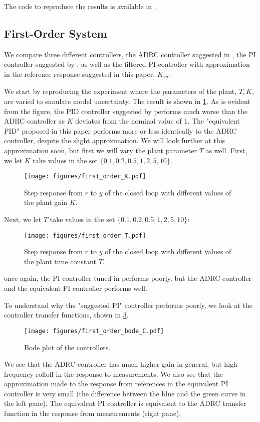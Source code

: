 \documentclass[letterpaper, 10 pt, conference]{ieeeconf}
\begin{document}
The code to reproduce the results is available in \cite{repo}.

\subsection{First-Order System}

We compare three different controllers, the ADRC controller suggested in \cite{herbst2013simulative}, the PI controller suggested by \cite{herbst2013simulative}, as well as the filtered PI controller with approximation in the reference response suggested in this paper, $K_{ry}$.

We start by reproducing the experiment where the parameters of the plant, $T,K$, are varied to simulate model uncertainty. The result is shown in \cref{fig:first_order_K}. As is evident from the figure, the PID controller suggested by \cite{herbst2013simulative} performs much worse than the ADRC controller as $K$ deviates from the nominal value of 1. The "equivalent PID" proposed in this paper performs more or less identically to the ADRC controller, despite the slight approximation. We will look further at this approximation soon, but first we will vary the plant parameter $T$ as well.
First, we let $K$ take values in the set $\{0.1, 0.2, 0.5, 1, 2, 5, 10\}$.
\begin{figure}[h]
	\centering
	\texttt{[image: figures/first\_order\_K.pdf]}
	\caption{Step response from $r$ to $y$  of the closed loop with different values of the plant gain $K$.}
	\label{fig:first_order_K}
\end{figure}

Next, we let $T$ take values in the set $\{0.1, 0.2, 0.5, 1, 2, 5, 10\}$:
\begin{figure}[h]
	\centering
	\texttt{[image: figures/first\_order\_T.pdf]}
	\caption{Step response from $r$ to $y$  of the closed loop with different values of the plant time constant $T$.}
	\label{fig:first_order_T}
\end{figure}
once again, the PI controller tuned in \cite{herbst2013simulative} performs poorly, but the ADRC controller and the equivalent PI controller performs well.

To understand why the "suggested PI" controller performs poorly, we look at the controller transfer functions, shown in \cref{fig:first_order_bode_C}.
\begin{figure}[h]
	\centering
	\texttt{[image: figures/first\_order\_bode\_C.pdf]}
	\caption{Bode plot of the controllers.}
	\label{fig:first_order_bode_C}
\end{figure}
We see that the ADRC controller has much higher gain in general, but high-frequency rolloff in the response to measurements. We also see that the approximation made to the response from references in the equivalent PI controller is very small (the difference between the blue and the green curve in the left pane). The equivalent PI controller is equivalent to the ADRC transfer function in the response from measurements (right pane).
\end{document}
